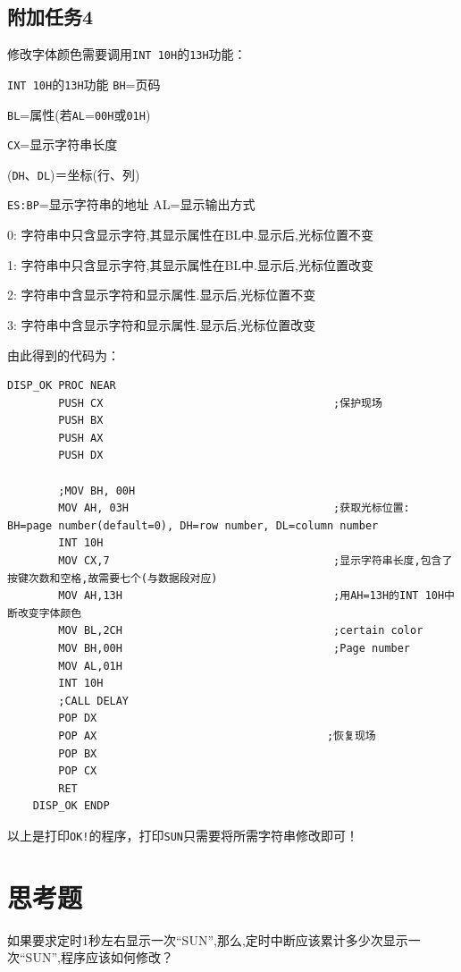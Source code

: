 \documentclass[11pt]{SEU-Digital-Report}
\begin{document}
\subsection{附加任务4}
修改字体颜色需要调用\texttt{INT 10H}的\texttt{13H}功能：
\begin{note}{\texttt{INT 10H}的\texttt{13H}功能}{}
    \texttt{BH}=页码

    \texttt{BL}=属性(若\texttt{AL}=\texttt{00H}或\texttt{01H})

    \texttt{CX}=显示字符串长度

    (\texttt{DH}、\texttt{DL})＝坐标(行、列)

    \texttt{ES:BP}=显示字符串的地址 AL=显示输出方式

    0: 字符串中只含显示字符,其显示属性在BL中.显示后,光标位置不变

    1: 字符串中只含显示字符,其显示属性在BL中.显示后,光标位置改变

    2: 字符串中含显示字符和显示属性.显示后,光标位置不变

    3: 字符串中含显示字符和显示属性.显示后,光标位置改变
\end{note}
由此得到的代码为：
\begin{lstlisting}[language={[x86masm]Assembler},title=code]
    DISP_OK PROC NEAR
        PUSH CX                                    ;保护现场
        PUSH BX
        PUSH AX
        PUSH DX

        ;MOV BH, 00H                                
        MOV AH, 03H                                ;获取光标位置: BH=page number(default=0), DH=row number, DL=column number
        INT 10H
        MOV CX,7                                   ;显示字符串长度,包含了按键次数和空格,故需要七个(与数据段对应)
        MOV AH,13H                                 ;用AH=13H的INT 10H中断改变字体颜色
        MOV BL,2CH                                 ;certain color
        MOV BH,00H                                 ;Page number
        MOV AL,01H
        INT 10H                                   
        ;CALL DELAY
        POP DX
        POP AX                                    ;恢复现场
        POP BX
        POP CX
        RET
    DISP_OK ENDP
\end{lstlisting}
以上是打印\texttt{OK!}的程序，打印\texttt{SUN}只需要将所需字符串修改即可！
\section{思考题}
如果要求定时1秒左右显示一次“SUN”,那么,定时中断应该累计多少次显示一次“SUN”,程序应该如何修改？
\end{document}

